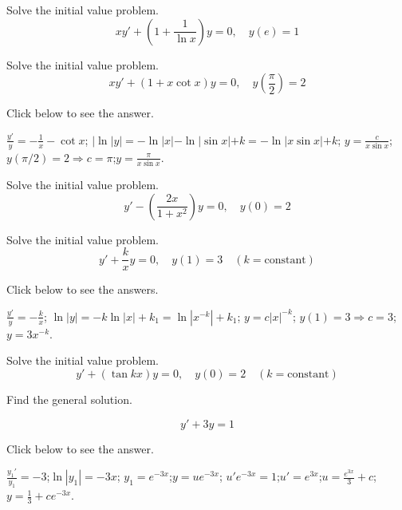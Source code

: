 \documentclass{ximera}
\begin{document}
\begin{problem}\label{exer:2.1.7} Solve
the initial value problem.
$$xy'+\left(1+\frac{1}{\ln x}\right)y=0,\quad y(e)=1$$
\end{problem}

\begin{problem}\label{exer:2.1.8} Solve
the initial value problem.
$$xy'+(1+ x\cot x)y=0,\quad y\left(\frac{\pi}{2}
\right)=2$$

Click below to see the answer.

\begin{expandable}
    $\frac{y'}{y}=-\frac{1}{x}-\cot x$;
\quad $|\ln|y|=-\ln|x|-\ln|\sin x|+k=-\ln|x\sin x|+k$;\quad
$y=\frac{c}{x\sin x}$;\quad $y(\pi/2)=2\Rightarrow
c=\pi$;\quad $y=\frac{\pi}{x\sin x}$.
\end{expandable}
\end{problem}

\begin{problem}\label{exer:2.1.9} Solve
the initial value problem.
$$y'-\left(\frac{2x}{1+x^2}\right)y=0,\quad y(0)=2$$
\end{problem}

\begin{problem}\label{exer:2.1.10} Solve
the initial value problem.
$$y'+\frac{k}{x}y=0,\quad y(1)=3 \quad (k=
\mbox{constant})$$

Click below to see the answers.

\begin{expandable}
    $\frac{y'}{ y}=-\frac{k}{ x}$;\quad
$\ln|y|=-k\ln|x|+k_1=\ln|x^{-k}|+k_1$;\quad
$y=c|x|^{-k}$;\quad
$y(1)=3\Rightarrow c=3$;\quad $y=3x^{-k}$.
\end{expandable}
\end{problem}

\begin{problem}\label{exer:2.1.11} Solve
the initial value problem.
$$y'+(\tan kx)y=0,\quad y(0)=2 \quad (k= \mbox{constant})$$
\end{problem}


\begin{problem}\label{exer:2.1.12} Find
the general solution. 

$$y'+3y=1$$



Click below to see the answer.

\begin{expandable}
    $\frac{y_1'}{ y_1}=-3$;\quad $\ln|y_1|=-3x$;\quad
$y_1=e^{-3x}$;\quad $y=ue^{-3x}$;\quad
$u'e^{-3x}=1$;\quad $u'=e^{3x}$;\quad $u=\frac{e^{3x}}{3}+c$;\quad
$y=\frac{1}{3}+ce^{-3x}$.
\end{expandable}

\end{problem}
\end{document}
